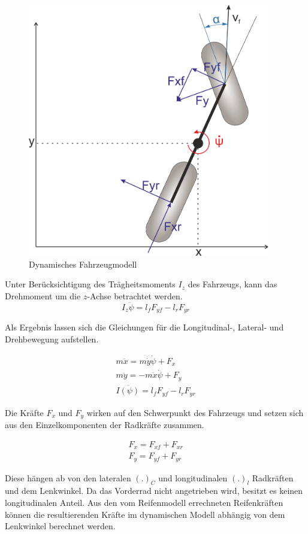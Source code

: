 \documentclass{like}
\begin{document}
\begin{figure}[ht!]
	\centering
	\includegraphics[width=300pt]{Abbildungen/dynBicycle.png}
	\caption{Dynamisches Fahrzeugmodell}
	\label{fig:dynModel}
\end{figure}

Unter Berücksichtigung des Trägheitsmoments \(I_z\) des Fahrzeugs, kann das Drehmoment um die \(z\)-Achse betrachtet werden.
\begin{equation}
I_z \ddot{\psi} = l_f F_{yf} - l_r F_{yr}
\end{equation}

Als Ergebnis lassen sich die Gleichungen für die Longitudinal-, Lateral- und Drehbewegung aufstellen.

\begin{eqnarray}
m \ddot{x} = m \dot{y} \dot{\psi} + F_x \\
m \ddot{y} = - m \dot{x} \dot{\psi} + F_y \\
I \ddot{(\psi)} = l_f F_{yf} - l_r F_{yr}
\end{eqnarray}

Die Kräfte \(F_{x}\) und \(F_{y}\) wirken auf den Schwerpunkt des Fahrzeugs und setzen sich aus den Einzelkomponenten der Radkräfte zusammen.

\begin{eqnarray}
F_x = F_{xf} + F_{xr} \\
F_y = F_{yf} + F_{yr}
\end{eqnarray}

Diese hängen ab von den lateralen \((.)_C\) und longitudinalen \((.)_l\)    Radkräften und dem Lenkwinkel. Da das Vorderrad nicht angetrieben wird, besitzt es keinen longitudinalen Anteil. Aus den vom Reifenmodell errechneten Reifenkräften können die resultierenden Kräfte im dynamischen Modell abhängig von dem Lenkwinkel berechnet werden.
\end{document}

